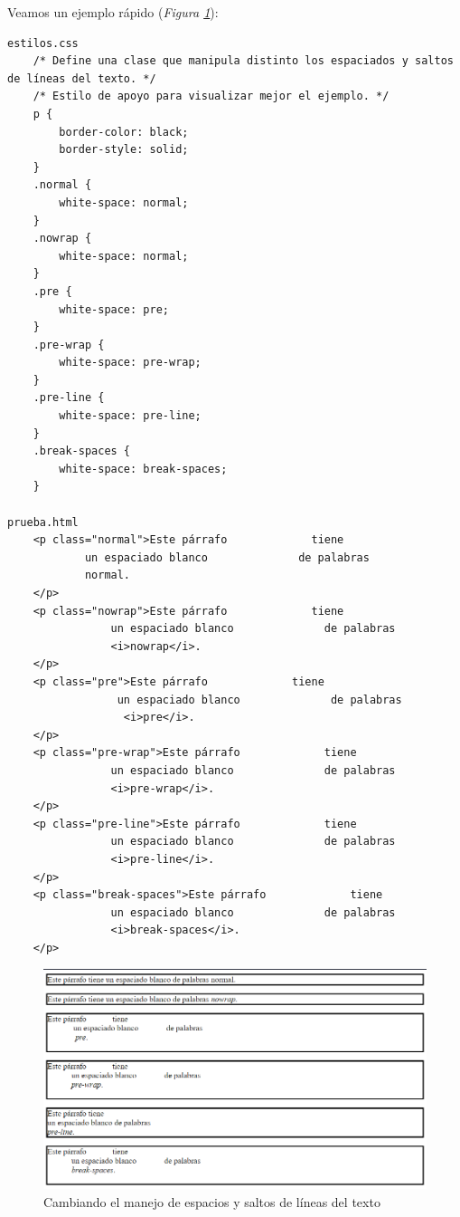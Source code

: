Veamos un ejemplo rápido (\textit{Figura \ref{fig: 18}}):
\begin{lstlisting}
estilos.css
    /* Define una clase que manipula distinto los espaciados y saltos de líneas del texto. */
    /* Estilo de apoyo para visualizar mejor el ejemplo. */
    p {
        border-color: black;
        border-style: solid;
    }
    .normal {
        white-space: normal;
    }
    .nowrap {
        white-space: normal;
    }
    .pre {
        white-space: pre;
    }
    .pre-wrap {
        white-space: pre-wrap;
    }
    .pre-line {
        white-space: pre-line;
    }
    .break-spaces {
        white-space: break-spaces;
    }
        
prueba.html
    <p class="normal">Este párrafo             tiene
            un espaciado blanco              de palabras
            normal.
    </p>
    <p class="nowrap">Este párrafo             tiene
                un espaciado blanco              de palabras
                <i>nowrap</i>.
    </p>
    <p class="pre">Este párrafo             tiene
                 un espaciado blanco              de palabras
                  <i>pre</i>.
    </p>
    <p class="pre-wrap">Este párrafo             tiene
                un espaciado blanco              de palabras
                <i>pre-wrap</i>.
    </p>
    <p class="pre-line">Este párrafo             tiene
                un espaciado blanco              de palabras
                <i>pre-line</i>.
    </p>
    <p class="break-spaces">Este párrafo             tiene
                un espaciado blanco              de palabras
                <i>break-spaces</i>.
    </p>
\end{lstlisting}
\begin{figure}[H]
    \centering
    \caption{Cambiando el manejo de espacios y saltos de líneas del texto}
    \label{fig: 18}
    \includegraphics[width=14cm]{ss/fuentes-white-sp.png}
\end{figure}
